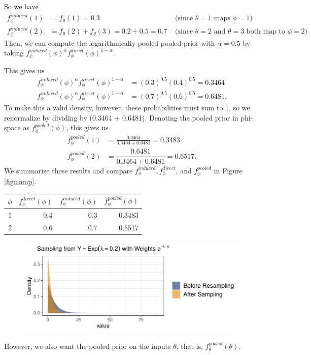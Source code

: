 \documentclass[12pt,twoside]{smiththesis}
\begin{document}
So we have
\begin{align*}
f_\phi^{induced}(1) &= f_{\theta}(1) = 0.3 & \text{ (since $\theta = 1$ maps $\phi = 1$) } \\
f_\phi^{induced}(2) &= f_{\theta}(2) +  f_{\theta}(3) = 0.2 + 0.5=  0.7 & \text{ (since $\theta = 2$ and $\theta=3$ both map to $\phi = 2$) }
\end{align*}
Then, we can compute the logarithmically pooled pooled prior with \(\alpha=0.5\) by taking \(f_\phi^{induced}(\phi)^{\alpha} f_\phi^{direct}(\phi)^{1-\alpha}\).

This gives us
\begin{align*}
f_\phi^{induced}(\phi)^{\alpha} f_\phi^{direct}(\phi)^{1-\alpha} &= (0.3)^{0.5}(0.4)^{0.5} = 0.3464\\
f_\phi^{induced}(\phi)^{\alpha} f_\phi^{direct}(\phi)^{1-\alpha} &= (0.7)^{0.5}(0.6)^{0.5} = 0.6481.
\end{align*}
To make this a valid density, however, these probabilities must sum to 1, so we renormalize by dividing by (0.3464 + 0.6481). Denoting the pooled prior in phi-space as \(f_\phi^{pooled}(\phi)\), this gives us
\begin{align*}
f_\phi^{pooled}(1) &= \frac{ 0.3464  }  { 0.3464 + 0.6481 } = 0.3483 \\
f_\phi^{pooled}(2) &= \dfrac{ 0.6481 } { 0.3464 + 0.6481}  =0.6517.
\end{align*}
We summarize these results and compare \(f_\phi^{induced}, f_\phi^{direct}\), and \(f_\phi^{pooled}\) in Figure \ref{fig:comp}.
\begin{multicols}{2}
\begin{table}[H]
\centering
\begin{tabular}[t]{r|r|r|r}
\hline
$\phi$ & $f_\phi^{direct}(\phi)$ & $f_\phi^{induced}(\phi)$ & $f_\phi^{pooled}(\phi)$\\
\hline
1 & 0.4 & 0.3 & 0.3483\\
\hline
2 & 0.6 & 0.7 & 0.6517\\
\hline
\end{tabular}
\end{table}
\columnbreak
\begin{figure}

{\centering \includegraphics{thesis_files/figure-latex/unnamed-chunk-15-1} 

}

\caption{\label{fig:comp}}\label{fig:unnamed-chunk-15}
\end{figure}
\end{multicols}
However, we also want the pooled prior on the inputs \(\theta\), that is, \(f_\theta^{pooled}(\theta)\).
\end{document}
